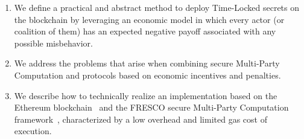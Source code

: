 \begin{enumerate}

	\smallskip
 	\item We define a practical and abstract method to deploy Time-Locked secrets on the blockchain by leveraging an economic model in which every actor (or coalition of them) has an expected negative payoff associated with any possible misbehavior.
 	
 	\smallskip
 	\item We address the problems that arise when combining secure Multi-Party Computation and protocols based on economic incentives and penalties. 
  
  	\smallskip
 	\item We describe how to technically realize an implementation based on the Ethereum blockchain~\cite{wood2014ethereum} and the FRESCO secure Multi-Party Computation framework~\cite{damgaard2016mpc}, characterized by a low overhead and limited gas cost of execution.

\end{enumerate}


